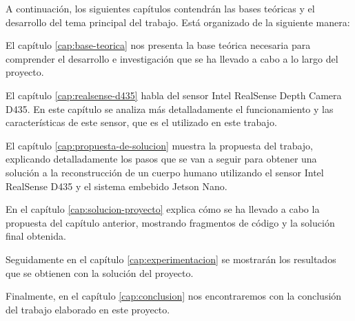 A continuación, los siguientes capítulos contendrán las bases teóricas y el desarrollo del tema principal del trabajo.
Está organizado de la siguiente manera:

El capítulo \ref{cap:base-teorica} nos presenta la base teórica necesaria para comprender el desarrollo e investigación que se ha llevado a cabo a lo largo del proyecto.

El capítulo \ref{cap:realsense-d435} habla del sensor Intel RealSense Depth Camera D435.
En este capítulo se analiza más detalladamente el funcionamiento y las características de este sensor, que es el utilizado en este trabajo.

El capítulo \ref{cap:propuesta-de-solucion} muestra la propuesta del trabajo, explicando detalladamente los pasos que se van a seguir para obtener una solución a la reconstrucción de un cuerpo humano utilizando el sensor Intel RealSense D435 y el sistema embebido Jetson Nano.

En el capítulo \ref{cap:solucion-proyecto} explica cómo se ha llevado a cabo la propuesta del capítulo anterior, mostrando fragmentos de código y la solución final obtenida.

Seguidamente en el capítulo \ref{cap:experimentacion} se mostrarán los resultados que se obtienen con la solución del proyecto.

Finalmente, en el capítulo \ref{cap:conclusion} nos encontraremos con la conclusión del trabajo elaborado en este proyecto.
